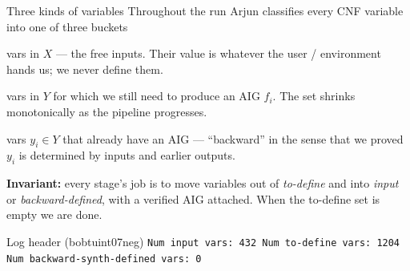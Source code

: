\documentclass[aspectratio=169]{beamer}
\begin{document}
\begin{frame}{Three kinds of variables}
  Throughout the run Arjun classifies every CNF variable into one of three
  buckets
  \medskip

  \begin{description}\setlength{\itemsep}{4pt}
    \item[\textcolor{stageA}{\textbf{input}}] vars in $X$ --- the
      free inputs. Their value is whatever the user / environment hands
      us; we never define them.
    \item[\textcolor{stageB}{\textbf{to-define}}] vars in $Y$ for which we
      still need to produce an AIG $f_i$. The set shrinks monotonically as
      the pipeline progresses.
    \item[\textcolor{stageC}{\textbf{backward-defined}}] vars
      $y_i \in Y$ that already have an AIG --- ``backward'' in the sense
      that we proved $y_i$ is determined by inputs and earlier outputs.
  \end{description}
  \medskip

  \textbf{Invariant:} every stage's job is to move variables out of
  \emph{to-define} and into \emph{input} or \emph{backward-defined}, with a verified AIG
  attached. When the to-define set is empty we are done.
  \medskip

  \begin{exampleblock}{\small Log header (bobtuint07neg)}
  \scriptsize
  \texttt{Num input vars: 432 \; Num to-define vars: 1204 \;
  Num backward-synth-defined vars: 0}
  \end{exampleblock}
\end{frame}
\end{document}
